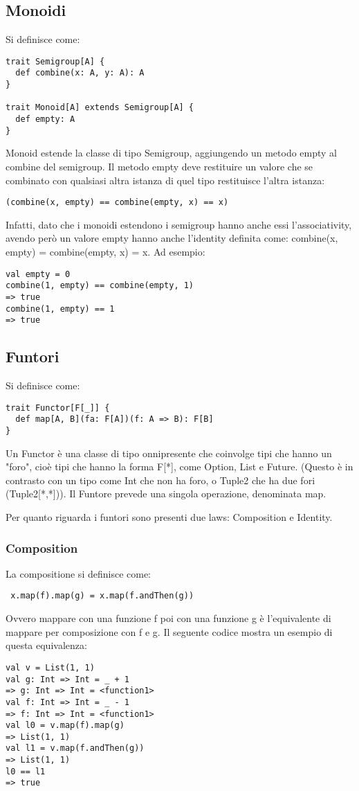 \subsection{Monoidi}
Si definisce come:
\begin{verbatim}
trait Semigroup[A] {
  def combine(x: A, y: A): A
}

trait Monoid[A] extends Semigroup[A] {
  def empty: A
}
\end{verbatim}

\noindent Monoid estende la classe di tipo Semigroup, aggiungendo un metodo empty al combine del semigroup. Il metodo empty deve restituire un valore che se combinato con qualsiasi altra istanza di quel tipo restituisce l'altra istanza: 
\begin{verbatim}
(combine(x, empty) == combine(empty, x) == x)
\end{verbatim}
\noindent Infatti, dato che i monoidi estendono i semigroup hanno anche essi l’associativity, avendo
però un valore empty hanno anche l’identity definita come: combine(x, empty) = combine(empty, x) = x.
Ad esempio:
\begin{verbatim}
val empty = 0
combine(1, empty) == combine(empty, 1)
=> true
combine(1, empty) == 1
=> true
\end{verbatim}

\subsection{Funtori}
Si definisce come: 
\begin{verbatim}
trait Functor[F[_]] {
  def map[A, B](fa: F[A])(f: A => B): F[B]
}
\end{verbatim}
\noindent Un Functor è una classe di tipo onnipresente che coinvolge tipi che hanno un "foro", cioè tipi che hanno la forma F[*], come Option, List e Future. (Questo è in contrasto con un tipo come Int che non ha foro, o Tuple2 che ha due fori (Tuple2[*,*])). Il Funtore prevede una singola operazione, denominata map.

\noindent Per quanto riguarda i funtori sono presenti due laws: Composition e Identity.
\subsubsection{Composition}
La compositione si definisce come:
\begin{verbatim}
 x.map(f).map(g) = x.map(f.andThen(g))
 \end{verbatim}
\noindent Ovvero mappare con una funzione f poi con una funzione g è l'equivalente di mappare per composizione
con f e g. Il seguente codice mostra un esempio di questa equivalenza:
\begin{verbatim}
val v = List(1, 1)
val g: Int => Int = _ + 1
=> g: Int => Int = <function1>
val f: Int => Int = _ - 1
=> f: Int => Int = <function1>
val l0 = v.map(f).map(g)
=> List(1, 1)
val l1 = v.map(f.andThen(g))
=> List(1, 1)
l0 == l1
=> true
 \end{verbatim}

